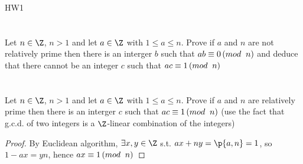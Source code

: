\documentclass[11pt]{article}
\begin{document}
\begin{center}
    {\Huge HW1}
\end{center}


\section*{} Let $n\in \Z$, $n>1$ and let $a\in\Z$ with $1\leq a \leq n$. Prove if $a$ and $n$ are not relatively prime then there is an interger $b$ such that $ab \equiv 0 \left(mod \;\; n \right)$ and deduce that there cannot be an integer $c$ such that $ac \equiv 1 \left(mod \;\; n \right)$


\section*{} Let $n\in \Z$, $n>1$ and let $a\in\Z$ with $1\leq a \leq n$. Prove if $a$ and $n$ are relatively prime then there is an interger $c$ such that $ac \equiv 1 \left(mod \;\; n \right)$ (use the fact that g.c.d. of two integers is a $\Z$-linear combination of the integers)

\begin{proof}
    By Euclidean algorithm, $\exists x,y\in\Z$ s.t. $ax + ny = \p{a, n} = 1$, so $1 - ax = yn$, hence $ax \equiv 1 \left(mod \;\; n \right)$
\end{proof}
\end{document}
